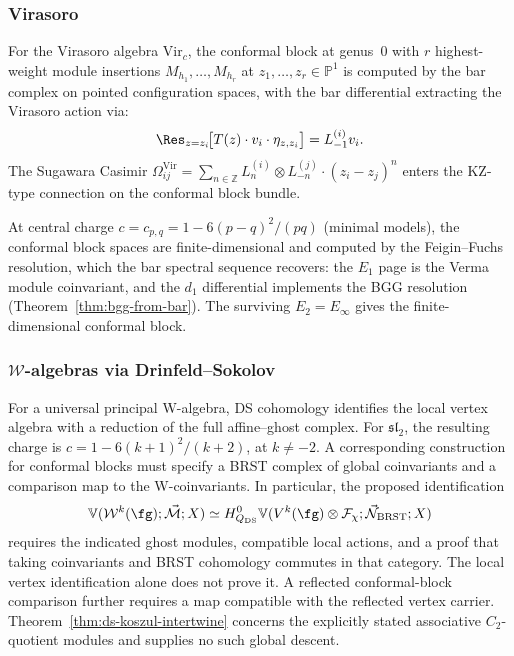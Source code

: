 \subsubsection{Virasoro}

For the Virasoro algebra $\mathrm{Vir}_c$, the conformal block at
genus~$0$ with $r$ highest-weight module insertions
$M_{h_1}, \ldots, M_{h_r}$ at $z_1, \ldots, z_r \in \mathbb{P}^1$
is computed by the bar complex on pointed configuration spaces, with
the bar differential extracting the Virasoro action via:
\[
\Res_{z = z_i}\!\bigl[T(z) \cdot v_i \cdot \eta_{z,z_i}\bigr]
= L_{-1}^{(i)} v_i.
\]
The Sugawara Casimir
$\Omega^{\mathrm{Vir}}_{ij}
= \sum_{n \in \mathbb{Z}} L_n^{(i)} \otimes L_{-n}^{(j)}
\cdot (z_i - z_j)^{n}$
enters the KZ-type connection on the conformal block bundle.

At central charge $c = c_{p,q} = 1 - 6(p-q)^2/(pq)$ (minimal
models), the conformal block spaces are finite-dimensional and
computed by the Feigin--Fuchs resolution, which the bar spectral
sequence recovers: the $E_1$ page is the Verma module coinvariant,
and the $d_1$ differential implements the BGG resolution
(Theorem~\ref{thm:bgg-from-bar}).  The surviving $E_2 = E_\infty$
gives the finite-dimensional conformal block.

\subsubsection{$\mathcal{W}$-algebras via Drinfeld--Sokolov}

For a universal principal W-algebra, DS cohomology identifies the local vertex algebra with a reduction of the full affine--ghost complex.
For $\mathfrak{sl}_2$, the resulting charge is $c=1-6(k+1)^2/(k+2)$, at $k\ne-2$.
A corresponding construction for conformal blocks must specify a BRST complex of global coinvariants and a comparison map to the W-coinvariants.
In particular, the proposed identification
\[
 \mathbb V(\mathcal W^k(\fg);\vec{\mathcal M};X)
 \simeq H^0_{Q_{\mathrm{DS}}}
 \mathbb V(V^k(\fg)\otimes\mathcal F_\chi;\vec{\mathcal N}_{\mathrm{BRST}};X)
\]
requires the indicated ghost modules, compatible local actions, and a proof that taking coinvariants and BRST cohomology commutes in that category.
The local vertex identification alone does not prove it.
A reflected conformal-block comparison further requires a map compatible with the reflected vertex carrier.
Theorem~\ref{thm:ds-koszul-intertwine} concerns the explicitly stated associative $C_2$-quotient modules and supplies no such global descent.

